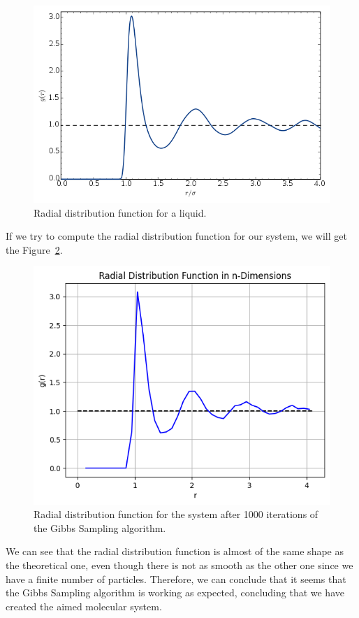 \documentclass{report}
\begin{document}
\begin{figure}[H]
	\centering
	\includegraphics[width=0.5\linewidth]{./Figures/MCMC/LennardJones/radialdistributionfunction.png}
	\caption{Radial distribution function for a liquid.}
	\label{fig:radialdistributionfunction}
\end{figure}

If we try to compute the radial distribution function for our system, we will get the Figure~\ref{fig:radialdistributionfunctionmh}.

\begin{figure}[H]
	\centering
	\includegraphics[width=0.52\linewidth]{./Figures/MCMC/LennardJones/rdf_exp.png}
	\caption{Radial distribution function for the system after 1000 iterations of the Gibbs Sampling algorithm.}
	\label{fig:radialdistributionfunctionmh}
\end{figure}

We can see that the radial distribution function is almost of the same shape as the theoretical one, even though there is not as smooth as the other one since we have a finite number of particles. Therefore, we can conclude that it seems that the Gibbs Sampling algorithm is working as expected, concluding that we have created the aimed molecular system.

\newpage



\end{document}
